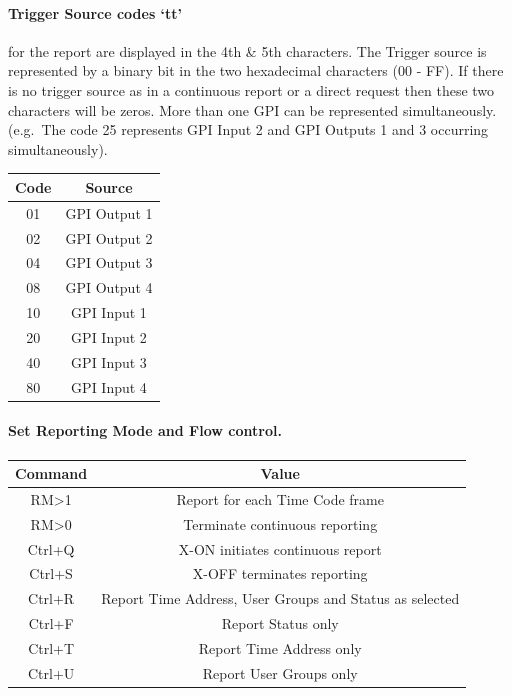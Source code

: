 \documentclass{article}
\begin{document}
			\paragraph{Trigger Source codes `tt'}\label{trigger-source-codes-tt}
				for the report are displayed in the 4th \& 5th characters. The Trigger 	source is represented by a binary bit in the two hexadecimal characters 	(00 - FF). If there is no trigger source as in a continuous report or a 	direct request then these two characters will be zeros. More than one GPI can be represented simultaneously. (e.g.~The code 25 represents GPI Input 2 and GPI Outputs 1 and 3 occurring simultaneously).
				\begin{center}
					\begin{tabular}{|c|c|}
						\hline
						Code & Source \\
						\hline
						01 & GPI Output 1 \\
						02 & GPI Output 2 \\
						04 & GPI Output 3 \\
						08 & GPI Output 4 \\
						10 & GPI Input 1 \\
						20 & GPI Input 2 \\
						40 & GPI Input 3 \\
						80 & GPI Input 4 \\
						\hline
					\end{tabular}
				\end{center}

			\paragraph{Set Reporting Mode and Flow  control.}\label{set-reporting-mode-and-flow-control.}
				\begin{center}
					\begin{tabular}{|c|c|}
						\hline
						Command & Value \\
						\hline
						RM\textgreater1 & Report for each Time Code frame \\ 
						RM\textgreater0 & Terminate continuous reporting \\ 
						Ctrl+Q & X-ON initiates continuous report \\ 
						Ctrl+S & X-OFF terminates reporting \\ 
						Ctrl+R & Report Time Address, User Groups and Status as selected \\ 
						Ctrl+F & Report Status only \\ 
						Ctrl+T & Report Time Address only \\ 
						Ctrl+U & Report User Groups only \\
						\hline
					\end{tabular}
				\end{center}
			
\end{document}
